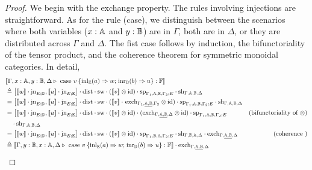 \documentclass[10pt,a4paper]{amsart}
\theoremstyle{definition}
\theoremstyle{definition}
\theoremstyle{definition}
\theoremstyle{definition}
\theoremstyle{definition}
\theoremstyle{definition}
\begin{document}
\begin{proof}
  We begin with the exchange property. The rules involving injections are
  straightforward. As for the rule  (case), we distinguish between the
  scenarios where both variables ($x : \mathbb{A}$ and $y : \mathbb{B}$) are in
  $\Gamma$, both are in $\Delta$, or they are distributed across $\Gamma$ and
  $\Delta$.  The fist case follows by induction, the bifunctoriality of the
  tensor product, and the coherence theorem for symmetric monoidal categories.
  In detail,
  \begin{align*}
    & [\![\Gamma,x:\typeA, y:\typeB, \Delta \vljud \text{ case }  v \hspace{2pt}  \{\text{inl}_{\typeE} (a) \Rightarrow w ; \hspace{1pt} \text{inr}_{\typeD} (b) \Rightarrow u\}: \typeF]\!] \\ 
    &\triangleq    \left[ [\![  w]\!] \cdot \text{jn}_{E;\typeD},[\![u]\!]\cdot \text{jn}_{E;\typeE }\right] \cdot \text{dist} \cdot \text{sw}   \cdot ([\![ v  ]\!] \otimes \text{id})  \cdot \text{sp}_{\Gamma_{1},\typeA, \typeB,\Gamma_{2};E} \cdot \text{sh}_{\Gamma,\typeA, \typeB,\Delta} \\
    & =  \left[ [\![  w]\!] \cdot \text{jn}_{E;\typeD},[\![u]\!]\cdot \text{jn}_{E;\typeE }\right] \cdot \text{dist} \cdot \text{sw}  \cdot ([\![v]\! ]\cdot \hspace{1pt} \text{exch}_{\Gamma_{1}, \underline{\typeA,\typeB},\Gamma_{2}} \otimes \text{id}) \cdot \text{sp}_{\Gamma_{1},\typeA, \typeB,\Gamma_{2};E} \cdot \text{sh}_{\Gamma,\typeA, \typeB,\Delta} \\
    &  = \left[ [\![w]\!] \cdot \text{jn}_{E;\typeD},[\![u]\!]\cdot \text{jn}_{E;\typeE }\right]  \cdot \text{dist} \cdot \text{sw}   \cdot ([\![ v ]\!]\otimes \text{id}) \cdot (\text{exch}_{\Gamma,  \underline{\typeA,  \typeB}, \Delta} \otimes \text{id}) \cdot \text{sp}_{\Gamma_{1},\typeA,\typeB, \Gamma_{2};E}  & {\text{(bifunctoriality of $\otimes$)}}\\
    & \hspace{10pt} \cdot  \text{sh}_{\Gamma,\typeA, \typeB,\Delta} \\
    & =   \left[ [\![ w]\!] \cdot \text{jn}_{E;\typeD},[\![u]\!]\cdot \text{jn}_{E;\typeE }\right]  \cdot \text{dist} \cdot \text{sw}  \cdot ([\![v]\!]\otimes \text{id}) \cdot \text{sp}_{\Gamma_{1},\typeB,\typeA, \Gamma_{2};E}  \cdot \text{sh}_{\Gamma,\typeB, \typeA,\Delta}  \cdot \text{exch}_{\Gamma,  \underline{\typeA,\typeB}, \Delta} & {\text{(coherence )}} \\
    & \triangleq   [\![\Gamma,y:\typeB, x:\typeA, \Delta \vljud \text{ case } v \hspace{2pt}  \{\text{inl}_{\typeE} (a) \Rightarrow w ; \hspace{1pt} \text{inr}_{\typeD} (b) \Rightarrow u\}: \typeF]\!] \cdot \text{exch}_{\Gamma,  \underline{\typeA, \typeB}, \Delta}
  \end{align*}



\end{proof}
\end{document}
